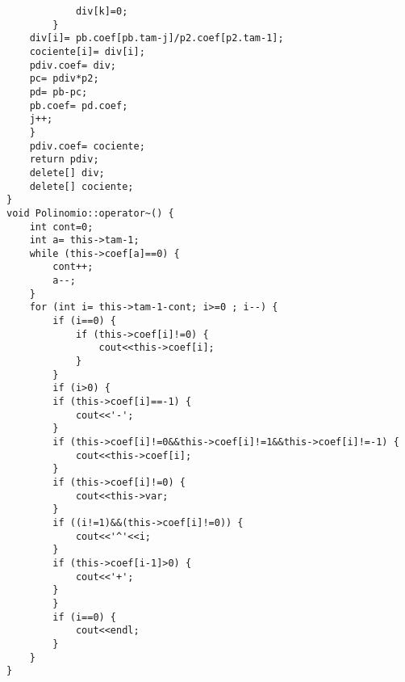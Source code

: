 \documentclass[11pt]{article}
\begin{document}
\begin{lstlisting}
			div[k]=0;
		}
	div[i]= pb.coef[pb.tam-j]/p2.coef[p2.tam-1];
	cociente[i]= div[i];
	pdiv.coef= div;
	pc= pdiv*p2;
	pd= pb-pc;
	pb.coef= pd.coef;
	j++;
	}
	pdiv.coef= cociente;
	return pdiv;
	delete[] div;
	delete[] cociente;
}
void Polinomio::operator~() {
	int cont=0;
	int a= this->tam-1;
	while (this->coef[a]==0) {
		cont++;
		a--;
	}
	for (int i= this->tam-1-cont; i>=0 ; i--) {
		if (i==0) {
			if (this->coef[i]!=0) {
				cout<<this->coef[i];
			}
		}
		if (i>0) {
		if (this->coef[i]==-1) {
			cout<<'-';
		}
		if (this->coef[i]!=0&&this->coef[i]!=1&&this->coef[i]!=-1) {
			cout<<this->coef[i];
		}
		if (this->coef[i]!=0) {
			cout<<this->var;
		}
		if ((i!=1)&&(this->coef[i]!=0)) {
			cout<<'^'<<i;
		}
		if (this->coef[i-1]>0) {
			cout<<'+';
		}
		}
		if (i==0) {
			cout<<endl;
		}
	}
}
\end{lstlisting}
\vspace{2 em}
\end{document}
